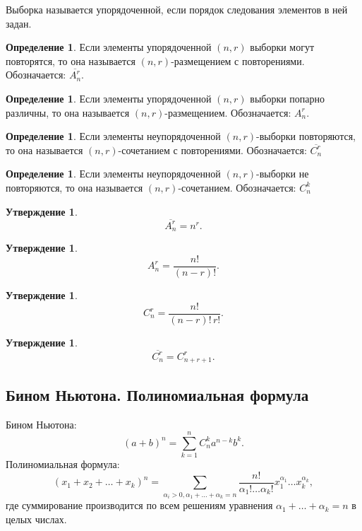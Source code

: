 \documentclass[12pt]{report}
\theoremstyle{definition}
\newtheorem{definition}[theorem]{Определение}
\newtheorem{statement}[theorem]{Утверждение}
\begin{document}
Выборка называется упорядоченной, если порядок следования элементов
в ней задан.

\begin{definition}
Если элементы упорядоченной $(n, r)$ выборки могут повторятся, то она
называется $(n, r)$-размещением с повторениями.
Обозначается: $\overline{A_n^r}$.
\end{definition}

\begin{definition}
Если элементы упорядоченной $(n, r)$ выборки попарно различны, то она
называется $(n, r)$-размещением.
Обозначается: $A_n^r$.
\end{definition}

\begin{definition}
Если элементы неупорядоченной $(n, r)$-выборки повторяются, то она
называется  $(n, r)$-сочетанием с повторениями.
Обозначается: $\overline{C_n^r}$
\end{definition}

\begin{definition}
Если элементы неупорядоченной $(n, r)$-выборки не повторяются, то она
называется  $(n, r)$-сочетанием.
Обозначается: $C_n^k$
\end{definition}

\begin{statement}
$$
\overline{A_n^r} = n^r.
$$
\end{statement}

\begin{statement}
$$
A_n^r = \dfrac{n!}{(n-r)!}.
$$
\end{statement}

\begin{statement}
$$
C_n^r = \dfrac{n!}{(n-r)!\, r!}.
$$
\end{statement}

\begin{statement}
$$
\overline{C_n^r} = C_{n + r + 1}^r.
$$
\end{statement}

\subsection{Бином Ньютона. Полиномиальная формула}
Бином Ньютона:
$$
(a + b)^n = \sum\limits_{k=1}^n C_n^k a^{n - k} b^k.
$$
Полиномиальная формула:
$$
(x_1 + x_2 + \dots + x_k)^n =
\sum\limits_{\alpha_i > 0, \alpha_1 + \dots + \alpha_k = n} \dfrac{n!}{\alpha_1! \dots \alpha_k!} x_1^{\alpha_1} \dots x_k^{\alpha_k},
$$
где суммирование производится по всем решениям уравнения $\alpha_1 + \dots + \alpha_k = n$ в целых числах.
\end{document}
